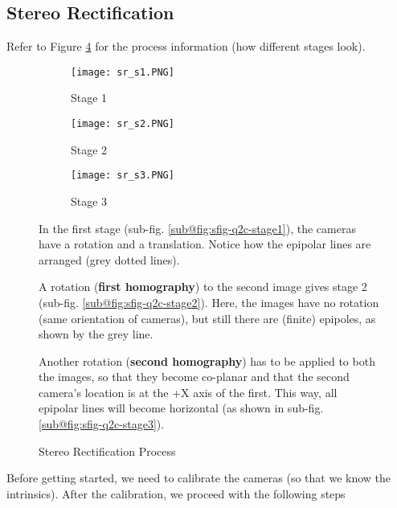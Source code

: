 
\subsection{Stereo Rectification}

Refer to Figure \ref{fig:q2c-sr-process} for the process information (how different stages look).

\begin{figure}[ht]
    \centering
    \begin{subfigure}[b]{0.3 \textwidth}
        \texttt{[image: sr\_s1.PNG]}
        \caption{Stage 1}
        \label{fig:sfig-q2c-stage1}
    \end{subfigure}
    \begin{subfigure}[b]{0.3 \textwidth}
        \texttt{[image: sr\_s2.PNG]}
        \caption{Stage 2}
        \label{fig:sfig-q2c-stage2}
    \end{subfigure}
    \begin{subfigure}[b]{0.3 \textwidth}
        \texttt{[image: sr\_s3.PNG]}
        \caption{Stage 3}
        \label{fig:sfig-q2c-stage3}
    \end{subfigure}
    \caption{Stereo Rectification Process}
    \label{fig:q2c-sr-process}
    \small
        In the first stage (sub-fig. \ref{sub@fig:sfig-q2c-stage1}), the cameras have a rotation and a translation. Notice how the epipolar lines are arranged (grey dotted lines).
        
        A rotation (\textbf{first homography}) to the second image gives stage 2 (sub-fig. \ref{sub@fig:sfig-q2c-stage2}). Here, the images have no rotation (same orientation of cameras), but still there are (finite) epipoles, as shown by the grey line.
        
        Another rotation (\textbf{second homography}) has to be applied to both the images, so that they become co-planar and that the second camera's location is at the +X axis of the first. This way, all epipolar lines will become horizontal (as shown in sub-fig. \ref{sub@fig:sfig-q2c-stage3}).
\end{figure}

Before getting started, we need to calibrate the cameras (so that we know the intrinsics). After the calibration, we proceed with the following steps

